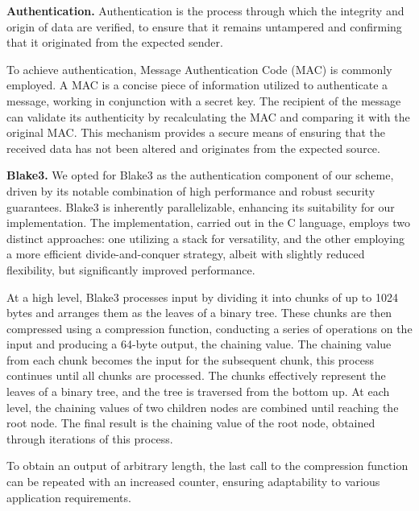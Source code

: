 \documentclass[letterpaper]{article}
\newcommand{\mypar}[1]{{\bf #1.}}
\begin{document}
\mypar{Authentication}
Authentication is the process through which the integrity and origin of data are verified, to ensure that it remains untampered and confirming that it originated from the expected sender. %

To achieve authentication, Message Authentication Code (MAC) is commonly employed. A MAC is a concise piece of information utilized to authenticate a message, working in conjunction with a secret key. The recipient of the message can validate its authenticity by recalculating the MAC and comparing it with the original MAC. This mechanism provides a secure means of ensuring that the received data has not been altered and originates from the expected source.

\mypar{Blake3}
We opted for Blake3 as the authentication component of our scheme, driven by its notable combination of high performance and robust security guarantees. Blake3 is inherently parallelizable, enhancing its suitability for our implementation. The implementation, carried out in the C language, employs two distinct approaches: one utilizing a stack for versatility, and the other employing a more efficient divide-and-conquer strategy, albeit with slightly reduced flexibility, but significantly improved performance.

At a high level, Blake3 processes input by dividing it into chunks of up to 1024 bytes and arranges them as the leaves of a binary tree. These chunks are then compressed using a compression function, conducting a series of operations on the input and producing a 64-byte output, the chaining value. The chaining value from each chunk becomes the input for the subsequent chunk, this process continues until all chunks are processed. The chunks effectively represent the leaves of a binary tree, and the tree is traversed from the bottom up. At each level, the chaining values of two children nodes are combined until reaching the root node. The final result is the chaining value of the root node, obtained through iterations of this process.

To obtain an output of arbitrary length, the last call to the compression function can be repeated with an increased counter, ensuring adaptability to various application requirements.
\end{document}
